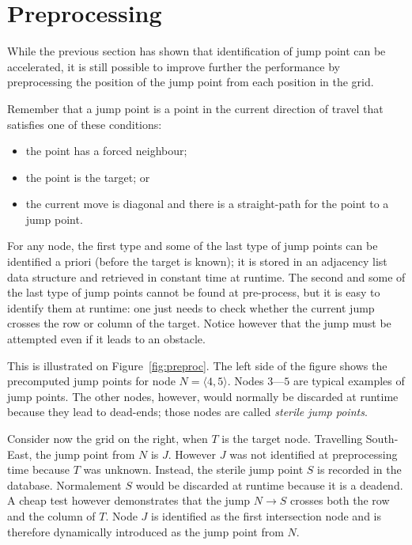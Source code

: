 \section{Preprocessing}
\label{sec::preprocessing}

While the previous section has shown 
that identification of jump point can be accelerated, 
it is still possible to improve further the performance 
by preprocessing the position of the jump point 
from each position in the grid.  

Remember that a jump point 
is a point in the current direction of travel 
that satisfies one of these conditions: 
\begin{itemize}
\item 
  the point has a forced neighbour; 
\item 
  the point is the target; or 
\item 
  the current move is diagonal 
  and there is a straight-path for the point to a jump point.  
\end{itemize}
For any node, 
the first type and some of the last type of jump points 
can be identified a priori (before the target is known); 
it is stored in an adjacency list data structure 
and retrieved in constant time at runtime.  
The second and some of the last type of jump points 
cannot be found at pre-process, 
but it is easy to identify them at runtime: 
one just needs to check whether the current jump 
crosses the row or column of the target.  
Notice however that the jump must be attempted 
even if it leads to an obstacle.  

This is illustrated on Figure~\ref{fig:preproc}.  
The left side of the figure shows the precomputed jump points 
for node $N = \langle 4,5\rangle$.  
Nodes $3$---$5$ are typical examples of jump points.  
The other nodes, however, would normally be discarded 
at runtime because they lead to dead-ends; 
those nodes are called \emph{sterile jump points}.  

Consider now the grid on the right, when $T$ is the target node.  
Travelling South-East, the jump point from $N$ is $J$.  
However $J$ was not identified at preprocessing time 
because $T$ was unknown.  
Instead, the sterile jump point $S$ is recorded in the database.  
Normalement $S$ would be discarded at runtime 
because it is a deadend.  
A cheap test however demonstrates that the jump $N\rightarrow S$ 
crosses both the row and the column of $T$.  
Node $J$ is identified as the first intersection node 
and is therefore dynamically introduced as the jump point from $N$.  


